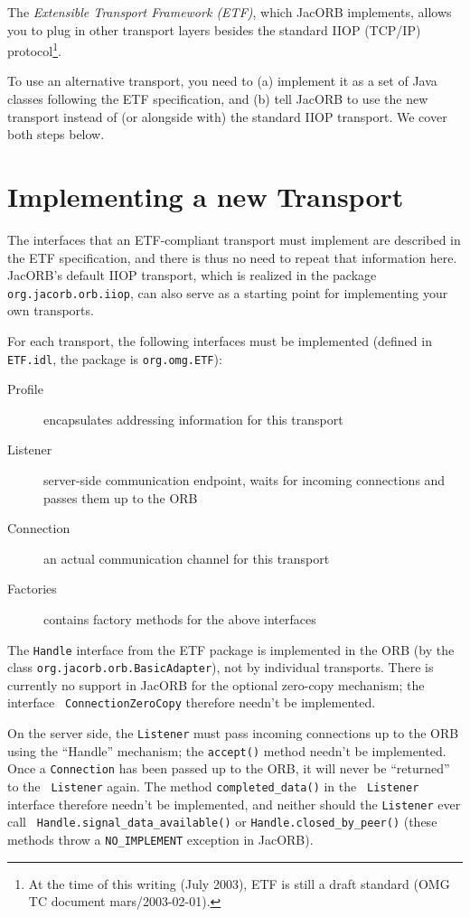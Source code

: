 
The \emph{Extensible Transport Framework (ETF)}, which JacORB
implements, allows you to plug in other transport layers besides the
 standard IIOP (TCP/IP) protocol\footnote{At the time of
 this writing (July 2003), ETF is still a draft standard (OMG TC
 document mars/2003-02-01).}.

To use an alternative transport, you need to (a) implement it as a set
of Java classes following the ETF specification, and (b) tell JacORB
to use the new transport instead of (or alongside with) the standard
IIOP transport.  We cover both steps below.

\section{Implementing a new Transport}

The interfaces that an ETF-compliant transport must implement are
 described in the ETF specification, and there is thus no need to
 repeat that information here.  JacORB's default IIOP transport, which
 is realized in the package {\tt org.jacorb.orb.iiop}, can also serve
 as a starting point for implementing your own transports.

For each transport, the following interfaces must be implemented
(defined in {\tt ETF.idl}, the package is {\tt org.omg.ETF}):

\begin{description}
\item[Profile] encapsulates addressing information for this transport
\item[Listener] server-side communication endpoint, waits for incoming
connections and passes them up to the ORB
\item[Connection] an actual communication channel for this transport
\item[Factories] contains factory methods for the above interfaces
\end{description}

The {\tt Handle} interface from the ETF package is implemented in the
 ORB (by the class {\tt org.jacorb.orb.BasicAdapter}), not by
 individual transports.  There is currently no support in JacORB for
 the optional zero-copy mechanism; the interface {\tt
 ConnectionZeroCopy} therefore needn't be implemented.

On the server side, the {\tt Listener} must pass incoming connections
 up to the ORB using the ``Handle'' mechanism; the {\tt accept()}
 method needn't be implemented.  Once a {\tt Connection} has been
 passed up to the ORB, it will never be ``returned'' to the {\tt
 Listener} again.  The method {\tt completed\_data()} in the {\tt
 Listener} interface therefore needn't be implemented, and neither
 should the {\tt Listener} ever call {\tt
 Handle.signal\_data\_available()} or {\tt Handle.closed\_by\_peer()}
 (these methods throw a {\tt NO\_IMPLEMENT} exception in JacORB).

